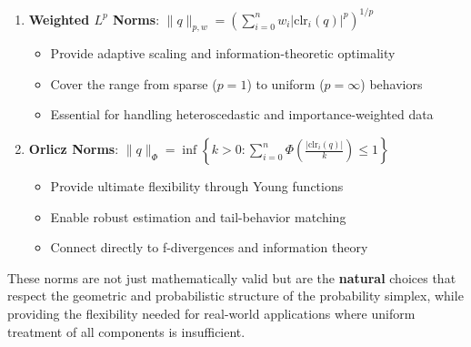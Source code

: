\documentclass{amsart}
\theoremstyle{plain}
\theoremstyle{definition}
\theoremstyle{remark}
\begin{document}
\begin{enumerate}
	\item \textbf{Weighted $L^p$ Norms}: $\|q\|_{p,w} = \left( \sum_{i=0}^n w_i |\text{clr}_i(q)|^p \right)^{1/p}$
	\begin{itemize}
		\item Provide adaptive scaling and information-theoretic optimality
		\item Cover the range from sparse ($p=1$) to uniform ($p=\infty$) behaviors
		\item Essential for handling heteroscedastic and importance-weighted data
	\end{itemize}
	\item \textbf{Orlicz Norms}: $\|q\|_\Phi = \inf \left\{ k > 0 : \sum_{i=0}^n \Phi\left(\frac{|\text{clr}_i(q)|}{k}\right) \leq 1 \right\}$
	\begin{itemize}
		\item Provide ultimate flexibility through Young functions
		\item Enable robust estimation and tail-behavior matching
		\item Connect directly to f-divergences and information theory
	\end{itemize}
\end{enumerate}

These norms are not just mathematically valid but are the \textbf{natural} choices that respect the geometric and probabilistic structure of the probability simplex, while providing the flexibility needed for real-world applications where uniform treatment of all components is insufficient.
\end{document}
